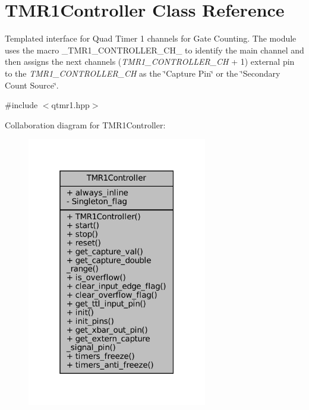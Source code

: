 \hypertarget{classTMR1Controller}{}\section{T\+M\+R1\+Controller Class Reference}
\label{classTMR1Controller}


Templated interface for Quad Timer 1 channels for Gate Counting. The module uses the macro {\ttfamily \+\_\+\+T\+M\+R1\+\_\+\+C\+O\+N\+T\+R\+O\+L\+L\+E\+R\+\_\+\+C\+H\+\_\+} to identify the main channel and then assigns the next channel\textquotesingle{}s ({\itshape T\+M\+R1\+\_\+\+C\+O\+N\+T\+R\+O\+L\+L\+E\+R\+\_\+\+CH} + 1) external pin to the {\itshape T\+M\+R1\+\_\+\+C\+O\+N\+T\+R\+O\+L\+L\+E\+R\+\_\+\+CH} as the \char`\"{}\+Capture Pin\char`\"{} or the \char`\"{}\+Secondary Count Source\char`\"{}.  




{\ttfamily \#include $<$qtmr1.\+hpp$>$}



Collaboration diagram for T\+M\+R1\+Controller\+:\nopagebreak
\begin{figure}[H]
\begin{center}
\leavevmode
\includegraphics[width=223pt]{da/d98/classTMR1Controller__coll__graph}
\end{center}
\end{figure}
